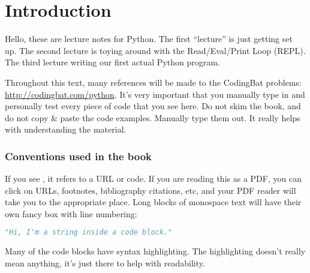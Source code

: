 \chapter{Introduction}

Hello, these are lecture notes for Python. The first ``lecture'' is
just getting set up. The second lecture is toying around with the
Read/Eval/Print Loop (REPL). The third lecture writing our first
actual Python program.

Throughout this text, many references will be made to the CodingBat
problems: \url{http://codingbat.com/python}. It's very important that
you manually type in and personally test every piece of code that you
see here. Do not skim the book, and do not copy \& paste the code
examples. Manually type them out. It really helps with understanding
the material.

\subsection{Conventions used in the book}

If you see , it refers to a URL or code. If you
are reading this as a PDF, you can click on URLs, footnotes,
bibliography citations, etc, and your PDF reader will take you to the
appropriate place. Long blocks of monospace text will have their own
fancy box with line numbering:

\begin{lstlisting}[language=Python]
"Hi, I'm a string inside a code block."
\end{lstlisting}

Many of the code blocks have syntax highlighting. The highlighting
doesn't really mean anything, it's just there to help with
readability. 

